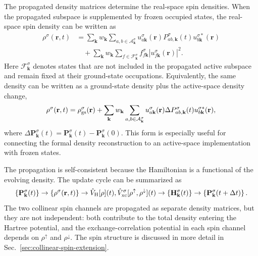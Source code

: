 The propagated density matrices determine the real-space spin densities.
When the propagated subspace is supplemented by frozen occupied states,
the real-space spin density can be written as
\begin{align}
  \rho^{\sigma}(\mathbf r,t)
  &=
  \sum_{\mathbf k}
  w_{\mathbf k}
  \sum_{a,b\in\mathcal A_{\mathbf k}^{\sigma}}
  u_{a\mathbf k}^{\sigma}(\mathbf r)
  P_{ab,\mathbf k}^{\sigma}(t)
  u_{b\mathbf k}^{\sigma *}(\mathbf r)
  \nonumber\\
  &\quad
  +
  \sum_{\mathbf k}
  w_{\mathbf k}
  \sum_{f\in\mathcal F_{\mathbf k}^{\sigma}}
  f_{f\mathbf k}^{\sigma}
  \left|
    u_{f\mathbf k}^{\sigma}(\mathbf r)
  \right|^2 .
  \label{eq:spin_density_reconstruction}
\end{align}
Here $\mathcal F_{\mathbf k}^{\sigma}$ denotes states that are not
included in the propagated active subspace and remain fixed at their
ground-state occupations.  Equivalently, the same density can be written
as a ground-state density plus the active-space density change,
\begin{equation}
  \rho^{\sigma}(\mathbf r,t)
  =
  \rho_{\rm gs}^{\sigma}(\mathbf r)
  +
  \sum_{\mathbf k}
  w_{\mathbf k}
  \sum_{a,b\in\mathcal A_{\mathbf k}^{\sigma}}
  u_{a\mathbf k}^{\sigma}(\mathbf r)
  \Delta P_{ab,\mathbf k}^{\sigma}(t)
  u_{b\mathbf k}^{\sigma *}(\mathbf r),
  \label{eq:density_reconstruction_delta_p}
\end{equation}
where
$\Delta\mathbf P_{\mathbf k}^{\sigma}(t)
=\mathbf P_{\mathbf k}^{\sigma}(t)-\mathbf P_{\mathbf k}^{\sigma}(0)$.
This form is especially useful for connecting the formal density
reconstruction to an active-space implementation with frozen states.

The propagation is self-consistent because the Hamiltonian is a
functional of the evolving density.  The update cycle can be summarized as
\begin{equation}
  \left\{
    \mathbf P_{\mathbf k}^{\sigma}(t)
  \right\}
  \rightarrow
  \left\{
    \rho^{\sigma}(\mathbf r,t)
  \right\}
  \rightarrow
  \hat V_{\rm H}[\rho](t),
  \hat V_{\rm xc}^{\sigma}[\rho^\uparrow,\rho^\downarrow](t)
  \rightarrow
  \left\{
    \mathbf H_{\mathbf k}^{\sigma}(t)
  \right\}
  \rightarrow
  \left\{
    \mathbf P_{\mathbf k}^{\sigma}(t+\Delta t)
  \right\}.
  \label{eq:self_consistent_density_matrix_cycle}
\end{equation}
The two collinear spin channels are propagated as separate density
matrices, but they are not independent: both contribute to the total
density entering the Hartree potential, and the exchange-correlation
potential in each spin channel depends on $\rho^\uparrow$ and
$\rho^\downarrow$.  The spin structure is discussed in more detail in
Sec.~\ref{sec:collinear-spin-extension}.
